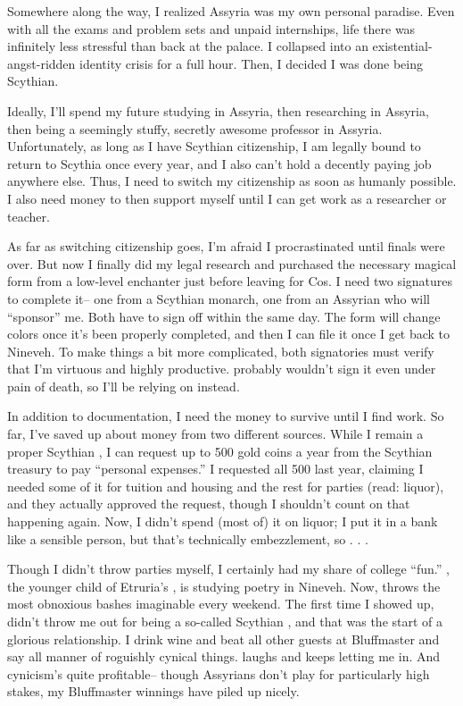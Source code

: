 \documentclass[char]{Kos}
\begin{document}
Somewhere along the way, I realized Assyria was my own personal paradise. Even with all the exams and problem sets and unpaid internships, life there was infinitely less stressful than back at the palace. I collapsed into an existential-angst-ridden identity crisis for a full hour. Then, I decided I was done being Scythian.

Ideally, I'll spend my future studying in Assyria, then researching in Assyria, then being a seemingly stuffy, secretly awesome professor in Assyria. Unfortunately, as long as I have Scythian citizenship, I am legally bound to return to Scythia once every year, and I also can't hold a decently paying job anywhere else. Thus, I need to switch my citizenship as soon as humanly possible. I also need money to then support myself until I can get work as a researcher or teacher.

As far as switching citizenship goes, I'm afraid I procrastinated until finals were over. But now I finally did my legal research and purchased the necessary magical form from a low-level enchanter just before leaving for Cos. I need two signatures to complete it-- one from a Scythian monarch, one from an Assyrian who will ``sponsor'' me. Both have to sign off within the same day. The form will change colors once it's been properly completed, and then I can file it once I get back to Nineveh. To make things a bit more complicated, both signatories must verify that I'm virtuous and highly productive. \cScythiaQueen{\Monarch} \cScythiaQueen{} probably wouldn't sign it even under pain of death, so I'll be relying on \cScythiaKing{} instead.

In addition to documentation, I need the money to survive until I find work. So far, I've saved up about money from two different sources. While I remain a proper Scythian \cWard{\prince}, I can request up to 500 gold coins a year from the Scythian treasury to pay ``personal expenses.'' I requested all 500 last year, claiming I needed some of it for tuition and housing and the rest for parties (read: liquor), and they actually approved the request, though I shouldn't count on that happening again. Now, I didn't spend (most of) it on liquor; I put it in a bank like a sensible person, but that's technically embezzlement, so . . . 

Though I didn't throw parties myself, I certainly had my share of college ``fun.'' \cPoet{\Prince} \cPoet{}, the younger child of Etruria's \cEtruriaKing{\Monarch} \cEtruriaKing{}, is studying poetry in Nineveh. Now, \cPoet{\they} throws the most obnoxious bashes imaginable every weekend. The first time I showed up, \cPoet{\they} didn't throw me out for being a so-called Scythian \cWard{\prince}, and that was the start of a glorious relationship. I drink \cPoet{\their} wine and beat all \cPoet{\their} other guests at Bluffmaster and say all manner of roguishly cynical things. \cPoet{\They} laughs and keeps letting me in. And cynicism's quite profitable-- though Assyrians don't play for particularly high stakes, my Bluffmaster winnings have piled up nicely.
\end{document}
